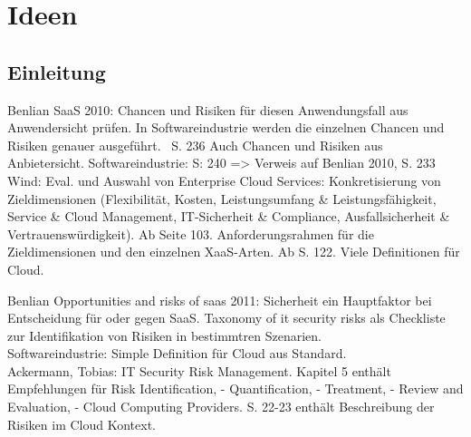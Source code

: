 \section{Ideen}
\subsection{Einleitung}
Benlian SaaS 2010: Chancen und Risiken für diesen Anwendungsfall aus Anwendersicht prüfen. In Softwareindustrie werden die einzelnen Chancen und Risiken genauer ausgeführt. ~S. 236
Auch Chancen und Risiken aus Anbietersicht. Softwareindustrie: S: 240 => Verweis auf Benlian 2010, S. 233 \\
Wind: Eval. und Auswahl von Enterprise Cloud Services: Konkretisierung von Zieldimensionen (Flexibilität, Kosten, Leistungsumfang  \& Leistungsfähigkeit, Service \& Cloud Management, IT-Sicherheit \&
Compliance, Ausfallsicherheit \& Vertrauenswürdigkeit). Ab Seite 103. Anforderungsrahmen für die Zieldimensionen und den einzelnen XaaS-Arten. Ab S. 122. Viele Definitionen für Cloud.

Benlian Opportunities and risks of saas 2011: Sicherheit ein Hauptfaktor bei Entscheidung für oder gegen SaaS. Taxonomy of it security risks als Checkliste zur Identifikation von Risiken in bestimmtren 
Szenarien. \\

Softwareindustrie: Simple Definition für Cloud aus Standard. \\

Ackermann, Tobias: IT Security Risk Management. Kapitel 5 enthält Empfehlungen für Risk Identification, - Quantification, - Treatment, - Review and Evaluation, - Cloud Computing Providers. S. 22-23 enthält
Beschreibung der Risiken im Cloud Kontext.
